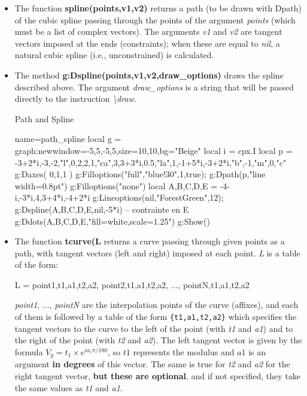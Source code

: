 \begin{itemize}
    \item The function \textbf{spline(points,v1,v2)} returns a path (to be drawn with Dpath) of the cubic spline passing through the points of the argument \emph{points} (which must be a list of complex vectors). The arguments \emph{v1} and \emph{v2} are tangent vectors imposed at the ends (constraints); when these are equal to \emph{nil}, a natural cubic spline (i.e., unconstrained) is calculated.

    \item The method \textbf{g:Dspline(points,v1,v2,draw\_options)} draws the spline described above. The argument \emph{draw\_options} is a string that will be passed directly to the instruction \emph{\textbackslash draw}.

\begin{demo}{Path and Spline}
\begin{luadraw}{name=path_spline}
local g = graph:new{window={-5,5,-5,5},size={10,10},bg="Beige"}
local i = cpx.I
local p = {-3+2*i,-3,-2,"l",0,2,2,1,"ca",3,3+3*i,0.5,"la",1,-1+5*i,-3+2*i,"b",-1,"m",0,"c"}
g:Daxes( {0,1,1} )
g:Filloptions("full","blue!30",1,true); g:Dpath(p,"line width=0.8pt")
g:Filloptions("none")
local A,B,C,D,E = -4-i,-3*i,4,3+4*i,-4+2*i
g:Lineoptions(nil,"ForestGreen",12); g:Dspline({A,B,C,D,E},nil,-5*i) -- contrainte en E
g:Ddots({A,B,C,D,E},"fill=white,scale=1.25")
g:Show()
\end{luadraw}
\end{demo}

    \item The function \textbf{tcurve(L} returns a curve passing through given points as a path, with tangent vectors (left and right) imposed at each point. \emph{L} is a table of the form:
\begin{Luacode}
L = {point1,{t1,a1,t2,a2}, point2,{t1,a1,t2,a2}, ..., pointN,{t1,a1,t2,a2}}
\end{Luacode}
\emph{point1}, ..., \emph{pointN} are the interpolation points of the curve (affixes), and each of them is followed by a table of the form \verb|{t1,a1,t2,a2}| which specifies the tangent vectors to the curve to the left of the point (with \emph{t1} and \emph{a1}) and to the right of the point (with \emph{t2} and \emph{a2}). The left tangent vector is given by the formula $V_g = t_1\times e^{ia_1\pi/180}$, so $t1$ represents the modulus and $a1$ is an argument \textbf{in degrees} of this vector. The same is true for \emph{t2} and \emph{a2} for the right tangent vector, \textbf{but these are optional}, and if not specified, they take the same values ​​as \emph{t1} and \emph{a1}.


\end{itemize}
